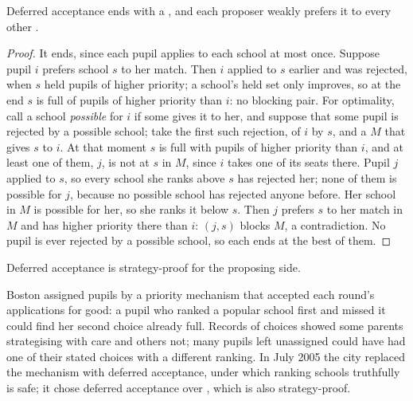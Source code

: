 \begin{proposition}\label{prop:b3:auctions-and-market-design:da}
Deferred acceptance ends with a , and each proposer weakly prefers it
to every other .
\end{proposition}

\begin{proof}
It ends, since each pupil applies to each school at most once. Suppose pupil $i$ prefers
school $s$ to her match. Then $i$ applied to $s$ earlier and was rejected, when $s$ held pupils
of higher priority; a school's held set only improves, so at the end $s$ is full of
pupils of higher priority than $i$: no blocking pair. For optimality, call a school
\emph{possible} for $i$ if some  gives it to her, and suppose that some
pupil is rejected by a possible school; take the first such rejection, of $i$ by $s$, and a
 $M$ that gives $s$ to $i$. At that moment $s$ is full with pupils of higher priority
than $i$, and at least one of them, $j$, is not at $s$ in $M$, since $i$ takes one of its seats there. Pupil $j$
applied to $s$, so every school she ranks above $s$ has rejected her; none of them is
possible for $j$, because no possible school has rejected anyone before. Her school in $M$ is
possible for her, so she ranks it below $s$. Then $j$ prefers $s$ to her match in $M$ and has
higher priority there than $i$: $(j, s)$ blocks $M$, a contradiction. No pupil is ever rejected by
a possible school, so each ends at the best of them.
\end{proof}

\begin{proposition}[Incentives]\label{prop:b3:auctions-and-market-design:incentives}
Deferred acceptance is strategy-proof for the proposing side.
\end{proposition}
\admitted

\begin{record}
Boston assigned pupils by a priority mechanism that accepted each round's
applications for good: a pupil who ranked a popular school first and missed it could
find her second choice already full. Records of choices showed some parents
strategising with care and others not; many pupils left unassigned could have had
one of their stated choices with a different ranking. In July 2005 the city replaced
the mechanism with deferred acceptance, under which ranking schools truthfully is
safe; it chose deferred acceptance over , which is also
strategy-proof. %
\end{record}

